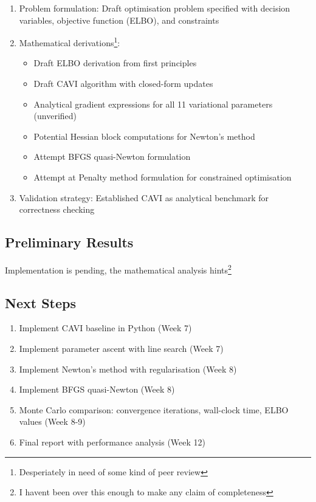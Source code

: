 \documentclass[11pt]{article}
\begin{document}
\begin{enumerate}
\item Problem formulation: Draft optimisation problem specified with decision variables, objective function (ELBO), and constraints

\item Mathematical derivations\footnote{Desperiately in need of some kind of peer review}:   
\begin{itemize}
\item Draft ELBO derivation from first principles
\item Draft CAVI algorithm with closed-form updates
\item Analytical gradient expressions for all 11 variational parameters (unverified) 
\item Potential Hessian block computations for Newton's method
\item Attempt BFGS quasi-Newton formulation
\item Attempt at Penalty method formulation for constrained optimisation
\end{itemize}

\item Validation strategy: Established CAVI as analytical benchmark for correctness checking
\end{enumerate}

\subsection*{Preliminary Results}

Implementation is pending, the mathematical analysis hints\footnote{I havent been over this enough to make any claim of completeness}
 
\newpage
\subsection*{Next Steps}

\begin{enumerate}
\item Implement CAVI baseline in Python (Week 7)
\item Implement parameter ascent with line search (Week 7)
\item Implement Newton's method with regularisation (Week 8)
\item Implement BFGS quasi-Newton (Week 8)
\item Monte Carlo comparison: convergence iterations, wall-clock time, ELBO values (Week 8-9)
\item Final report with performance analysis (Week 12)
\end{enumerate}
\end{document}
